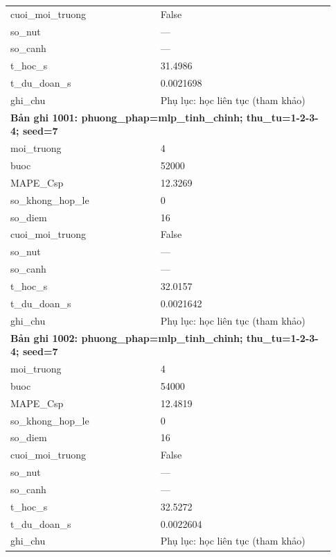 \begin{longtable}{p{0.43\linewidth}p{0.50\linewidth}}
cuoi\_\allowbreak moi\_\allowbreak truong & False \\
so\_\allowbreak nut & — \\
so\_\allowbreak canh & — \\
t\_\allowbreak hoc\_\allowbreak s & 31.4986 \\
t\_\allowbreak du\_\allowbreak doan\_\allowbreak s & 0.0021698 \\
ghi\_\allowbreak chu & Phụ lục: học liên tục (tham khảo) \\
\midrule
\multicolumn{2}{p{0.95\linewidth}}{\textbf{Bản ghi 1001: phuong\_phap=mlp\_tinh\_chinh; thu\_tu=1-2-3-4; seed=7}} \\
moi\_\allowbreak truong & 4 \\
buoc & 52000 \\
MAPE\_\allowbreak Csp & 12.3269 \\
so\_\allowbreak khong\_\allowbreak hop\_\allowbreak le & 0 \\
so\_\allowbreak diem & 16 \\
cuoi\_\allowbreak moi\_\allowbreak truong & False \\
so\_\allowbreak nut & — \\
so\_\allowbreak canh & — \\
t\_\allowbreak hoc\_\allowbreak s & 32.0157 \\
t\_\allowbreak du\_\allowbreak doan\_\allowbreak s & 0.0021642 \\
ghi\_\allowbreak chu & Phụ lục: học liên tục (tham khảo) \\
\midrule
\multicolumn{2}{p{0.95\linewidth}}{\textbf{Bản ghi 1002: phuong\_phap=mlp\_tinh\_chinh; thu\_tu=1-2-3-4; seed=7}} \\
moi\_\allowbreak truong & 4 \\
buoc & 54000 \\
MAPE\_\allowbreak Csp & 12.4819 \\
so\_\allowbreak khong\_\allowbreak hop\_\allowbreak le & 0 \\
so\_\allowbreak diem & 16 \\
cuoi\_\allowbreak moi\_\allowbreak truong & False \\
so\_\allowbreak nut & — \\
so\_\allowbreak canh & — \\
t\_\allowbreak hoc\_\allowbreak s & 32.5272 \\
t\_\allowbreak du\_\allowbreak doan\_\allowbreak s & 0.0022604 \\
ghi\_\allowbreak chu & Phụ lục: học liên tục (tham khảo) \\

\end{longtable}
